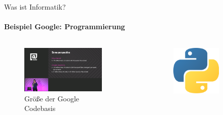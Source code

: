     \begin{frame}{Was ist Informatik?}
    \framesubtitle{Beispiel Google: Programmierung}
     \begin{columns}
        \begin{column}{0.5\textwidth}
            \begin{figure}
                \centering
                \includegraphics[width=\linewidth,height=0.6\textheight,keepaspectratio]{chapters/02_computer_science/figures/google/programming/loc.png}
                \caption{Größe der Google Codebasis \cite{google:potvin}}
                \label{fig:my_label}
            \end{figure}
        \end{column}
        \begin{column}{0.4\textwidth}
            \begin{figure}
            \centering
            \begin{subfigure}{0.475\textwidth}
                \centering
                \includegraphics[width=\textwidth,height=0.15\textheight,keepaspectratio]{chapters/02_computer_science/figures/google/programming/languages/python.png}

\end{subfigure}
\end{figure}
\end{column}
\end{columns}
\end{frame}
